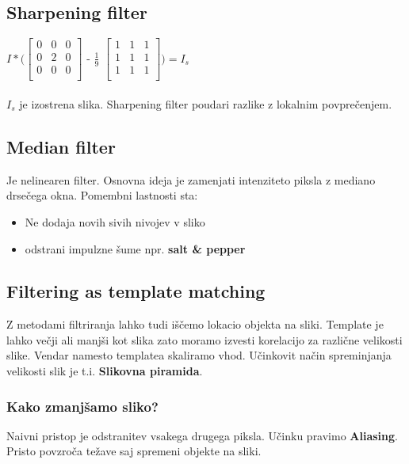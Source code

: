 \documentclass[11pt]{article}
\begin{document}
\subsection{Sharpening filter}
$I * (
  \left[ {\begin{array}{ccccccccc}
   0 & 0 & 0 \\
   0 & 2 & 0 \\
   0 & 0 & 0 \\
  \end{array} } \right]
$ - $\frac{1}{9}$
$
  \left[ {\begin{array}{ccccccccc}
   1 & 1 & 1 \\
   1 & 1 & 1 \\
   1 & 1 & 1 \\
  \end{array} } \right]
) = I_s$ \\
\\
$I_s$ je izostrena slika. Sharpening filter poudari razlike z lokalnim povpre\v{c}enjem.

\subsection{Median filter}
Je nelinearen filter. Osnovna ideja je zamenjati intenziteto piksla z mediano drse\v{c}ega okna. Pomembni lastnosti sta:
\begin{itemize}
\item Ne dodaja novih sivih nivojev v sliko
\item odstrani impulzne \v{s}ume npr. \textbf{salt \& pepper}
\end{itemize}

\newpage

\subsection{Filtering as template matching}
Z metodami filtriranja lahko tudi i\v{s}\v{c}emo lokacio objekta na sliki. Template je lahko ve\v{c}ji ali manj\v{s}i kot slika zato moramo izvesti korelacijo za razli\v{c}ne velikosti slike. Vendar namesto templatea skaliramo vhod. U\v{c}inkovit na\v{c}in spreminjanja velikosti slik je t.i. \textbf{Slikovna piramida}.

\subsubsection{Kako zmanj\v{s}amo sliko?}
Naivni pristop je odstranitev vsakega drugega piksla. U\v{c}inku pravimo \textbf{Aliasing}. Pristo povzro\v{c}a te\v{z}ave saj spremeni objekte na sliki.
\end{document}
